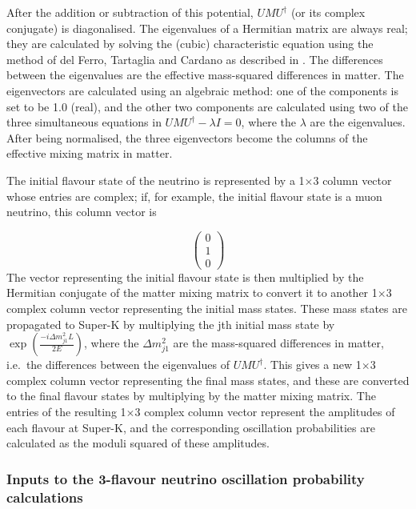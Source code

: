 After the addition or subtraction of this potential, $U M U^{\dagger}$ (or its complex conjugate) is diagonalised. The eigenvalues
of a Hermitian matrix are always real; they are calculated by solving the (cubic) characteristic equation using the method
of del Ferro, Tartaglia and Cardano as described in \cite{kopp}. The differences between the eigenvalues are the effective
mass-squared differences in matter. The eigenvectors are calculated using an algebraic method: one of the components is set
to be 1.0 (real), and the other two components are calculated using two of the three simultaneous equations in
$U M U^{\dagger} - \lambda I = 0$, where the $\lambda$ are the eigenvalues. After being normalised, the three eigenvectors
become the columns of the effective mixing matrix in matter.

The initial flavour state of the neutrino is represented by a 1$\times$3 column vector whose entries are complex; if, for
example, the initial flavour state is a muon neutrino, this column vector is

\begin{displaymath}
\left(
\begin{array}{c}
0 \\
1 \\
0
\end{array} \right)
\end{displaymath}
The vector representing the initial flavour state is then multiplied by the Hermitian conjugate of the matter mixing matrix
to convert it to another 1$\times$3 complex column vector representing the initial mass states. These mass states are propagated
to Super-K by multiplying the jth initial mass state by $\exp \left(\frac{-i \Delta m_{j1}^{2}L}{2E} \right)$, where the
$\Delta m_{j1}^{2}$ are the mass-squared differences in matter, i.e.\ the differences between the eigenvalues of $U M U^{\dagger}$.
This gives a new 1$\times$3 complex column vector representing the final mass states, and these are converted to the final flavour
states by multiplying by the matter mixing matrix. The entries of the resulting 1$\times$3 complex column vector represent the
amplitudes of each flavour at Super-K, and the corresponding oscillation probabilities are calculated as the moduli squared of these
amplitudes.  

%
%
\subsubsection*{Inputs to the 3-flavour neutrino oscillation probability calculations}

